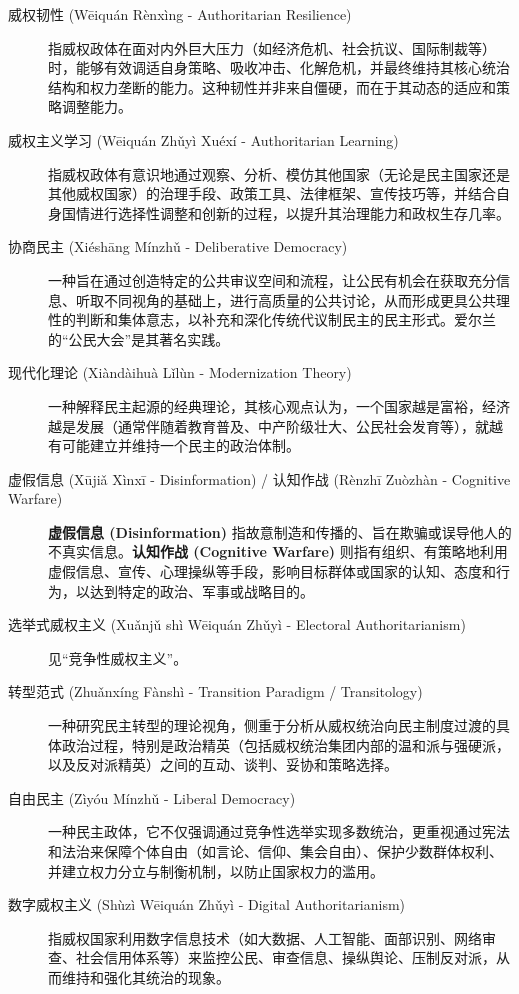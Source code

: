 \documentclass[UTF8, 10pt]{ctexbook}
\begin{document}
\begin{description}
    \item[威权韧性 (Wēiquán Rènxìng - Authoritarian Resilience)]
    指威权政体在面对内外巨大压力（如经济危机、社会抗议、国际制裁等）时，能够有效调适自身策略、吸收冲击、化解危机，并最终维持其核心统治结构和权力垄断的能力。这种韧性并非来自僵硬，而在于其动态的适应和策略调整能力。

    \item[威权主义学习 (Wēiquán Zhǔyì Xuéxí - Authoritarian Learning)]
    指威权政体有意识地通过观察、分析、模仿其他国家（无论是民主国家还是其他威权国家）的治理手段、政策工具、法律框架、宣传技巧等，并结合自身国情进行选择性调整和创新的过程，以提升其治理能力和政权生存几率。

    \item[协商民主 (Xiéshāng Mínzhǔ - Deliberative Democracy)]
    一种旨在通过创造特定的公共审议空间和流程，让公民有机会在获取充分信息、听取不同视角的基础上，进行高质量的公共讨论，从而形成更具公共理性的判断和集体意志，以补充和深化传统代议制民主的民主形式。爱尔兰的“公民大会”是其著名实践。

    \item[现代化理论 (Xiàndàihuà Lǐlùn - Modernization Theory)]
    一种解释民主起源的经典理论，其核心观点认为，一个国家越是富裕，经济越是发展（通常伴随着教育普及、中产阶级壮大、公民社会发育等），就越有可能建立并维持一个民主的政治体制。

    \item[虚假信息 (Xūjiǎ Xìnxī - Disinformation) / 认知作战 (Rènzhī Zuòzhàn - Cognitive Warfare)]
    \textbf{虚假信息 (Disinformation)} 指故意制造和传播的、旨在欺骗或误导他人的不真实信息。\textbf{认知作战 (Cognitive Warfare)} 则指有组织、有策略地利用虚假信息、宣传、心理操纵等手段，影响目标群体或国家的认知、态度和行为，以达到特定的政治、军事或战略目的。

    \item[选举式威权主义 (Xuǎnjǔ shì Wēiquán Zhǔyì - Electoral Authoritarianism)]
    见“竞争性威权主义”。

    \item[转型范式 (Zhuǎnxíng Fànshì - Transition Paradigm / Transitology)]
    一种研究民主转型的理论视角，侧重于分析从威权统治向民主制度过渡的具体政治过程，特别是政治精英（包括威权统治集团内部的温和派与强硬派，以及反对派精英）之间的互动、谈判、妥协和策略选择。

    \item[自由民主 (Zìyóu Mínzhǔ - Liberal Democracy)]
    一种民主政体，它不仅强调通过竞争性选举实现多数统治，更重视通过宪法和法治来保障个体自由（如言论、信仰、集会自由）、保护少数群体权利、并建立权力分立与制衡机制，以防止国家权力的滥用。

    \item[数字威权主义 (Shùzì Wēiquán Zhǔyì - Digital Authoritarianism)]
    指威权国家利用数字信息技术（如大数据、人工智能、面部识别、网络审查、社会信用体系等）来监控公民、审查信息、操纵舆论、压制反对派，从而维持和强化其统治的现象。
\end{description}
\end{document}
